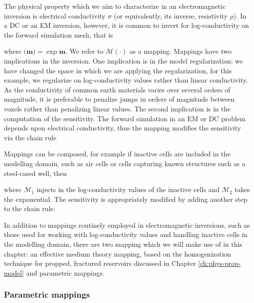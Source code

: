 The physical property which we aim to characterize in an electromagnetic inversion is electrical conductivity $\sigma$ (or equivalently, its inverse, resistivity $\rho$). In a DC or an EM inversion, however, it is common to invert for log-conductivity on the forward simulation mesh, that is

where $\mathcal(\mathbf{m}) = \exp{\mathbf{m}}$. We refer to $\mathcal{M}(\cdot)$ as a mapping. Mappings have two implications in the inversion. One implication is in the model regularization: we have changed the space in which we are applying the regularization, for this example, we regularize on log-conductivity values rather than linear conductivity. As the conductivity of common earth materials varies over several orders of magnitude, it is preferable to penalize jumps in orders of magnitude between voxels rather than penalizing linear values. The second implication is in the computation of the sensitivity. The forward simulation in an EM or DC problem depends upon electrical conductivity, thus the mapping modifies the sensitivity via the chain rule


Mappings can be composed, for example if inactive cells are included in the modelling domain, such as air cells or cells capturing known structures such as a steel-cased well, then

where $\mathcal{M}_1$ injects in the log-conductivity values of the inactive cells and $\mathcal{M}_2$ takes the exponential. The sensitivity is appropriately modified by adding another step to the chain rule.

In addition to mappings routinely employed in electromagnetic inversions, such as those used for working with log-conductivity values and handling inactive cells in the modelling domain, there are two mapping which we will make use of in this chapter: an effective medium theory mapping, based on the homogenization technique for propped, fractured reservoirs discussed in Chapter \ref{ch:phys-prop-model} and parametric mappings.

\subsubsection{Parametric mappings}

